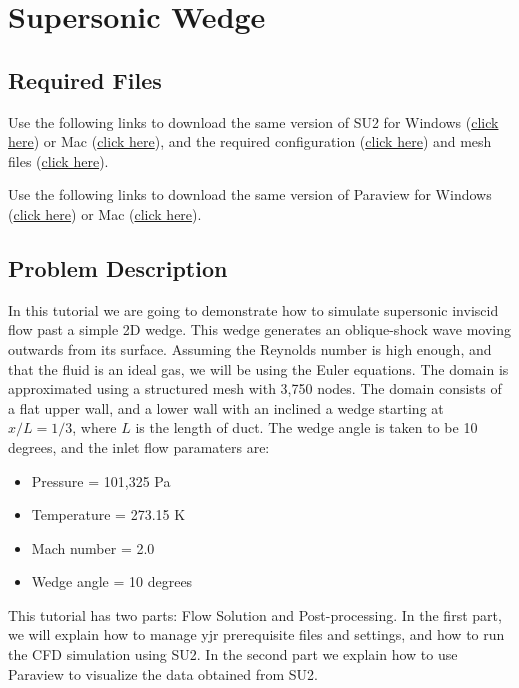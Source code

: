 \chapter{Supersonic Wedge}
\label{ch:Supersonic Wedge}
\section{Required Files}
\begin{su2note}
	Use the following links to download the same version of SU2 for Windows (\href{}{click here}) or Mac (\href{}{click here}), and the required configuration (\href{}{click here}) and mesh files (\href{}{click here}).
\end{su2note}
\begin{paraviewnote}
	Use the following links to download the same version of Paraview for Windows (\href{}{click here}) or Mac (\href{}{click here}).
\end{paraviewnote}
\section{Problem Description}
In this tutorial we are going to demonstrate how to simulate supersonic inviscid flow past a simple 2D wedge. This wedge generates an oblique-shock wave moving outwards from its surface. Assuming the Reynolds number is high enough, and that the fluid is an ideal gas, we will be using the Euler equations. The domain is approximated using a structured mesh with 3,750 nodes. The domain consists of a flat upper wall, and a lower wall with an inclined a wedge starting at $x/L=1/3$, where $L$ is the length of duct. The wedge angle is taken to be 10 degrees, and the inlet flow paramaters are:
\begin{itemize}
    \item Pressure = 101,325 Pa
    \item Temperature = 273.15 K
    \item Mach number = 2.0
    \item Wedge angle = 10 degrees
\end{itemize}
This tutorial has two parts: Flow Solution and Post-processing. In the first part, we will explain how to manage yjr prerequisite files and settings, and how to run the CFD simulation using SU2. In the second part we explain how to use Paraview to visualize the data obtained from SU2.
